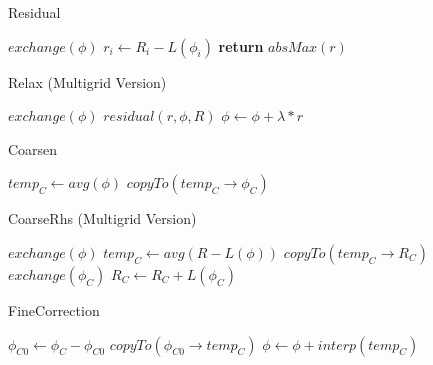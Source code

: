 \documentclass[12pt,a4paper]{article}
\begin{document}
\begin{algorithm}
\caption{Residual}
\begin{algorithmic}[1]
\State $exchange(\phi)$
	\State $r_i \gets R_i - L(\phi_i)$ 
\EndFor
\State \textbf{return} $absMax(r)$
\EndProcedure
\end{algorithmic}
\end{algorithm}


\begin{algorithm}
\caption{Relax (Multigrid Version)}
\begin{algorithmic}[1]
	\State $exchange(\phi)$
	\State $residual(r, \phi, R)$
	\State $\phi \gets \phi + \lambda * r$
\EndFor
\EndProcedure
\end{algorithmic}
\end{algorithm}

\begin{algorithm}
\caption{Coarsen}
\begin{algorithmic}[1]
\State $temp_C \gets avg(\phi)$
\State $copyTo(temp_C\rightarrow\phi_C)$
\EndProcedure
\end{algorithmic}
\end{algorithm}

\begin{algorithm}
\caption{CoarseRhs (Multigrid Version)}
\begin{algorithmic}[1]
\State $exchange(\phi)$
\State $temp_C \gets avg(R - L(\phi))$
\State $copyTo(temp_C\rightarrow R_C)$
\State $exchange(\phi_C)$
\State $R_C \gets R_C + L(\phi_C)$
\EndProcedure
\end{algorithmic}
\end{algorithm}

\begin{algorithm}
\caption{FineCorrection}
\begin{algorithmic}[1]
\State $\phi_{C0} \gets \phi_C - \phi_{C0}$
\State $copyTo(\phi_{C0}\rightarrow temp_C)$
\State $\phi \gets \phi + interp(temp_C)$
\EndProcedure
\end{algorithmic}
\end{algorithm}
\end{document}
